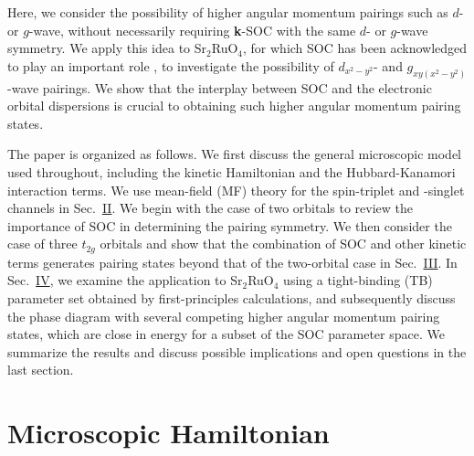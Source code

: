 \documentclass[%
reprint,
superscriptaddress,
 amsmath,amssymb,
 aps,
prb,
nobalancelastpage,
]{revtex4-2}
\begin{document}
Here, we consider the possibility of higher angular momentum pairings such as $d$- or $g$-wave, without necessarily requiring \textbf{k}-SOC with the same $d$- or $g$-wave symmetry. We apply this idea to Sr$_{2}$RuO$_{4}$, for which SOC has been acknowledged to play an important role \cite{Ng2000EPL,EreminPRB2002,AnnettPRB2006, Pavarini2006PRB,Haverkort2008PRL,IwasawaPRL2010,Rozbicki2011JPCM,Veenstra2014PRL,Kim2018PRL,Tamai2019PRX}, to investigate the possibility of $d_{x^2-y^2}$- and $g_{xy(x^2-y^2)}$-wave pairings. We show that the interplay between SOC and the electronic orbital dispersions is crucial to obtaining such higher angular momentum pairing states.


The paper is organized as follows. We first discuss the general microscopic model used throughout, including the kinetic Hamiltonian and the Hubbard-Kanamori interaction terms. We use mean-field (MF) theory for the spin-triplet and -singlet channels in Sec.~\hyperref[Two]{II}. We begin with the case of two orbitals to review the importance of SOC in determining the pairing symmetry. We then consider the case of three $t_{2g}$ orbitals and show that the combination of SOC and other kinetic terms generates pairing states beyond that of the two-orbital case in Sec.~\hyperref[Three]{III}. In Sec.~\hyperref[Four]{IV}, we examine the application to Sr$_{2}$RuO$_{4}$ using a tight-binding (TB) parameter set obtained by first-principles calculations, and subsequently discuss the phase diagram with several competing higher angular momentum pairing states, which are close in energy for a subset of the SOC parameter space. We summarize the results and discuss possible implications and open questions in the last section.


\section{\label{Two}Microscopic Hamiltonian}
\end{document}
